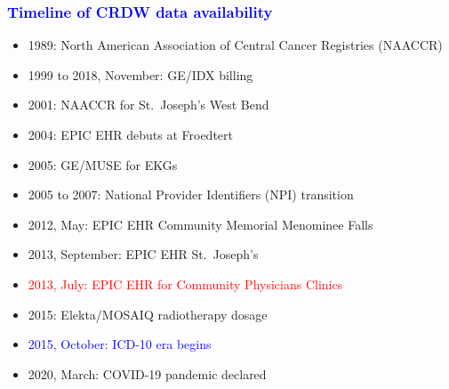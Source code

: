 \documentclass[11pt,pdftex,dvipsnames,usenames]{beamer}
\begin{document}
\begin{frame}[fragile]\frametitle{\bf\textcolor{blue}{Timeline of CRDW data availability}}

\begin{itemize}
\item 1989: North American Association of Central Cancer Registries (NAACCR)
\item 1999 to 2018, November: GE/IDX billing
\item 2001: NAACCR for St.\ Joseph's West Bend
\item 2004: EPIC EHR debuts at Froedtert
\item 2005: GE/MUSE for EKGs
\item 2005 to 2007: National Provider Identifiers (NPI) transition
\item 2012, May: EPIC EHR Community Memorial Menominee Falls
\item 2013, September: EPIC EHR St.\ Joseph's
\item \textcolor{red}{2013, July: EPIC EHR for Community Physicians Clinics} 
\item 2015: Elekta/MOSAIQ radiotherapy dosage
\item \textcolor{blue}{2015, October: ICD-10 era begins}
\item 2020, March: COVID-19 pandemic declared
\end{itemize}

\end{frame}
\end{document}
